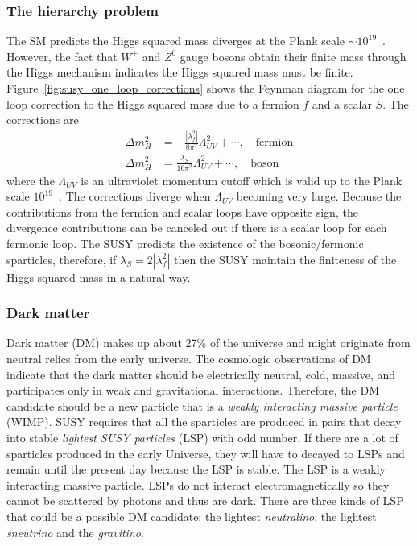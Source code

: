 \subsubsection{The hierarchy problem}
\label{subsubsec:susy_hierarchy_problem}
The SM predicts the Higgs squared mass diverges at the Plank scale $\sim 10^{19}$~{\GeV}.
However, the fact that $W^{\pm}$ and $Z^{0}$ gauge bosons obtain their finite mass through the Higgs mechanism indicates the Higgs squared mass must be finite.
Figure~\ref{fig:susy_one_loop_corrections} shows the Feynman diagram for the one loop correction to the Higgs squared mass due to a fermion $f$ and a scalar $S$.
The corrections are
%
\begin{align}
    \Delta m_{H}^{2} &= - \frac{|\lambda_{f}^{2}|}{8\pi^{2}} \Lambda_{UV}^{2} + \cdots, \quad \mathrm{fermion}\\
    \Delta m_{H}^{2} &= \frac{\lambda_{S}}{16\pi^{2}} \Lambda_{UV}^{2} + \cdots, \quad \mathrm{boson}
\end{align}
%
where the $\Lambda_{UV}$ is an ultraviolet momentum cutoff which is valid up to the Plank scale $10^{19}$~{\GeV}.
The corrections diverge when $\Lambda_{UV}$ becoming very large.
Because the contributions from the fermion and scalar loops have opposite sign, the divergence contributions can be canceled out if there is a scalar loop for each fermonic loop.
The SUSY predicts the existence of the bosonic/fermonic sparticles, therefore, if $\lambda_{S} = 2 |\lambda_{f}^{2}|$ then the SUSY maintain the finiteness of the Higgs squared mass in a natural way.


\subsubsection{Dark matter}
\label{subsubsec:susy_dark_matter}
Dark matter (DM) makes up about 27\% of the universe and might originate from neutral relics from the early universe.
The cosmologic observations of DM indicate that the dark matter should be electrically neutral, cold, massive, and participates only in weak and gravitational interactions.
Therefore, the DM candidate should be a new particle that is a \textit{weakly interacting massive particle} (WIMP).
SUSY requires that all the sparticles are produced in pairs that decay into stable \textit{lightest SUSY particles} (LSP) with odd number.
If there are a lot of sparticles produced in the early Universe, they will have to decayed to LSPs and remain until the present day because the LSP is stable.
The LSP is a weakly interacting massive particle.
LSPs do not interact electromagnetically so they cannot be scattered by photons and thus are dark.
There are three kinds of LSP that could be a possible DM candidate: the lightest \textit{neutralino}, the lightest \textit{sneutrino} and the \textit{gravitino}.

